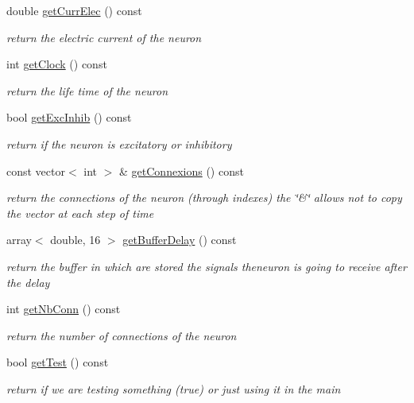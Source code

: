 \begin{DoxyCompactItemize}
double \hyperlink{classNeuron_ade3e91e8b14dddd572bdf7cba46b0770}{get\-Curr\-Elec} () const 
\begin{DoxyCompactList}\small\item\em return the electric current of the neuron \end{DoxyCompactList}\item 
int \hyperlink{classNeuron_ae5895ea008a267e0e834c35c8cd2cd68}{get\-Clock} () const 
\begin{DoxyCompactList}\small\item\em return the life time of the neuron \end{DoxyCompactList}\item 
bool \hyperlink{classNeuron_a0c1fb45caebd2868e5a7b26bad3a9714}{get\-Exc\-Inhib} () const 
\begin{DoxyCompactList}\small\item\em return if the neuron is excitatory or inhibitory \end{DoxyCompactList}\item 
const vector$<$ int $>$ \& \hyperlink{classNeuron_a1fe0ce80926d9f5e928367a522aecf88}{get\-Connexions} () const 
\begin{DoxyCompactList}\small\item\em return the connections of the neuron (through indexes) the \char`\"{}\&\char`\"{} allows not to copy the vector at each step of time \end{DoxyCompactList}\item 
array$<$ double, 16 $>$ \hyperlink{classNeuron_a697760f26fa78469d0e15767b85c2ca8}{get\-Buffer\-Delay} () const 
\begin{DoxyCompactList}\small\item\em return the buffer in which are stored the signals theneuron is going to receive after the delay \end{DoxyCompactList}\item 
int \hyperlink{classNeuron_a864fc4c8fe9c2e303f6617553c729661}{get\-Nb\-Conn} () const 
\begin{DoxyCompactList}\small\item\em return the number of connections of the neuron \end{DoxyCompactList}\item 
bool \hyperlink{classNeuron_ade02b2e51d19c01b2dbe032ecd8de8d1}{get\-Test} () const 
\begin{DoxyCompactList}\small\item\em return if we are testing something (true) or just using it in the main \end{DoxyCompactList}\item 

\end{DoxyCompactItemize}
